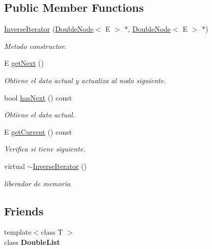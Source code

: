 \subsection*{Public Member Functions}
\begin{DoxyCompactItemize}
\item 
\hyperlink{class_inverse_iterator_a31703976cbdca73a1035f47509e8229d}{Inverse\-Iterator} (\hyperlink{class_double_node}{Double\-Node}$<$ E $>$ $\ast$, \hyperlink{class_double_node}{Double\-Node}$<$ E $>$ $\ast$)
\begin{DoxyCompactList}\small\item\em Metodo constructor. \end{DoxyCompactList}\item 
E \hyperlink{class_inverse_iterator_a4c1d8ceb8264f7f8186b6244a0a62940}{get\-Next} ()
\begin{DoxyCompactList}\small\item\em Obtiene el dato actual y actualiza al nodo siguiente. \end{DoxyCompactList}\item 
bool \hyperlink{class_inverse_iterator_a86973781dfa84df67be2843fc4545692}{has\-Next} () const 
\begin{DoxyCompactList}\small\item\em Obtiene el dato actual. \end{DoxyCompactList}\item 
E \hyperlink{class_inverse_iterator_afdbb5c310621c773da10dfb5bc3b1a4c}{get\-Current} () const 
\begin{DoxyCompactList}\small\item\em Verifica si tiene siguiente. \end{DoxyCompactList}\item 
\hypertarget{class_inverse_iterator_ae3b6736187c1dbc82ead0277d31e5898}{virtual \hyperlink{class_inverse_iterator_ae3b6736187c1dbc82ead0277d31e5898}{$\sim$\-Inverse\-Iterator} ()}\label{class_inverse_iterator_ae3b6736187c1dbc82ead0277d31e5898}

\begin{DoxyCompactList}\small\item\em liberador de memoria \end{DoxyCompactList}\end{DoxyCompactItemize}
\subsection*{Friends}
\begin{DoxyCompactItemize}
\item 
\hypertarget{class_inverse_iterator_ad435a9844a002995926acf522128f7a8}{{\footnotesize template$<$class T $>$ }\\class {\bfseries Double\-List}}\label{class_inverse_iterator_ad435a9844a002995926acf522128f7a8}

\end{DoxyCompactItemize}


